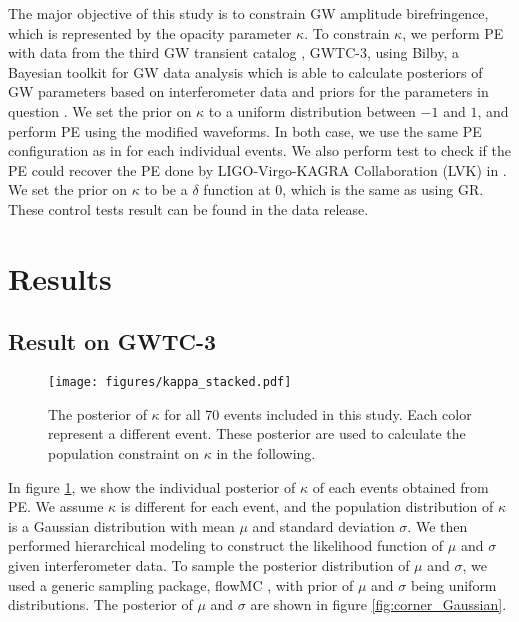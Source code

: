 \documentclass[reprint,amsmath,amssymb,aps,twocolumn]{aastex631}
\begin{document}
The major objective of this study is to constrain GW amplitude birefringence, which is represented by the opacity parameter $\kappa$.
To constrain $\kappa$, we perform PE with data from the third GW transient catalog \citep{GWTC-2.1, GWTC-3}, GWTC-3, using Bilby, a Bayesian toolkit for GW data analysis which is able to calculate posteriors of GW parameters based on interferometer data and priors for the parameters in question \citep{Bilby}. 
We set the prior on $\kappa$ to a uniform distribution between $-1$ and $1$, and perform PE using the modified waveforms.
In both case, we use the same PE configuration as in \citet{GWTC-2.1, GWTC-3} for each individual events.
We also perform test to check if the PE could recover the PE done by LIGO-Virgo-KAGRA Collaboration (LVK) in \citet{GWTC-2.1, GWTC-3}.
We set the prior on $\kappa$ to be a $\delta$ function at $0$, which is the same as using GR.
These control tests result can be found in the data release.

\section{Results}
\label{sec:Results}
\subsection{Result on GWTC-3}
\begin{figure}[h]
    \texttt{[image: figures/kappa\_stacked.pdf]}
    \caption{
        The posterior of $\kappa$ for all 70 events included in this study.
        Each color represent a different event.
        These posterior are used to calculate the population constraint on $\kappa$ in the following.
    }
    \label{fig:kappa_stacked}
\end{figure}

In figure \ref{fig:kappa_stacked}, we show the individual posterior of $\kappa$ of each events obtained from PE.
We assume $\kappa$ is different for each event, and the population distribution of $\kappa$ is a Gaussian distribution with mean $\mu$ and standard deviation $\sigma$.
We then performed hierarchical modeling to construct the likelihood function of $\mu$ and $\sigma$ given interferometer data.
To sample the posterior distribution of $\mu$ and $\sigma$, we used a generic sampling package, flowMC \citep{flowMC}, with prior of $\mu$ and $\sigma$ being uniform distributions.
The posterior of $\mu$ and $\sigma$ are shown in figure \ref{fig:corner_Gaussian}.
\end{document}

